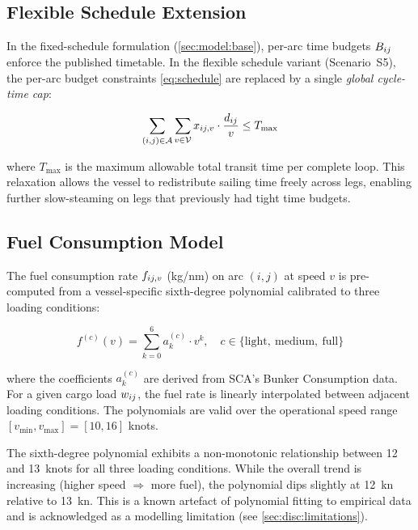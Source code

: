 \subsection{Flexible Schedule Extension}
\label{sec:model:flexible}

In the fixed-schedule formulation (\cref{sec:model:base}), per-arc time
budgets $B_{ij}$ enforce the published timetable. In the flexible
schedule variant (Scenario~S5), the per-arc budget constraints
\eqref{eq:schedule} are replaced by a single \textit{global cycle-time
cap}:

\begin{equation}
  \sum_{(i,j)\in\mathcal{A}} \sum_{v\in\mathcal{V}} x_{ij,v} \cdot \frac{d_{ij}}{v}
  \leq T_{\max}
  \label{eq:cycle_cap}
\end{equation}

\noindent where $T_{\max}$ is the maximum allowable total transit time
per complete loop. This relaxation allows the vessel to redistribute
sailing time freely across legs, enabling further slow-steaming on
legs that previously had tight time budgets.

\subsection{Fuel Consumption Model}
\label{sec:model:fuel}

The fuel consumption rate $f_{ij,v}$ (kg/nm) on arc $(i,j)$ at speed
$v$ is pre-computed from a vessel-specific sixth-degree polynomial
calibrated to three loading conditions:

\begin{equation}
  f^{(c)}(v) = \sum_{k=0}^{6} a_k^{(c)} \cdot v^k,
  \quad c \in \{\text{light},\ \text{medium},\ \text{full}\}
  \label{eq:poly_fuel}
\end{equation}

\noindent where the coefficients $a_k^{(c)}$ are derived from SCA's
Bunker Consumption data. For a given cargo load $w_{ij}$, the fuel rate
is linearly interpolated between adjacent loading conditions. The
polynomials are valid over the operational speed range
$[v_{\min}, v_{\max}] = [10, 16]$ knots.

\begin{remark}
  The sixth-degree polynomial exhibits a non-monotonic relationship
  between 12 and 13~knots for all three loading conditions. While the
  overall trend is increasing (higher speed $\Rightarrow$ more fuel),
  the polynomial dips slightly at 12~kn relative to 13~kn. This is
  a known artefact of polynomial fitting to empirical data and is
  acknowledged as a modelling limitation
  (see \cref{sec:disc:limitations}).
\end{remark}

